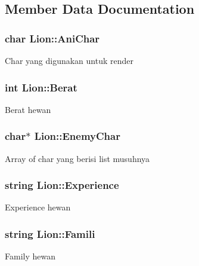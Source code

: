 \subsection{Member Data Documentation}
\subsubsection[{\texorpdfstring{Ani\+Char}{AniChar}}]{\setlength{\rightskip}{0pt plus 5cm}char Lion\+::\+Ani\+Char\hspace{0.3cm}{\ttfamily [protected]}}\hypertarget{class_lion_a9f5c3247359163932b6055386a90890e}{}\label{class_lion_a9f5c3247359163932b6055386a90890e}
Char yang digunakan untuk render 
\subsubsection[{\texorpdfstring{Berat}{Berat}}]{\setlength{\rightskip}{0pt plus 5cm}int Lion\+::\+Berat\hspace{0.3cm}{\ttfamily [protected]}}\hypertarget{class_lion_ac607d8553dce1ba2700571de651599de}{}\label{class_lion_ac607d8553dce1ba2700571de651599de}
Berat hewan 
\subsubsection[{\texorpdfstring{Enemy\+Char}{EnemyChar}}]{\setlength{\rightskip}{0pt plus 5cm}char$\ast$ Lion\+::\+Enemy\+Char\hspace{0.3cm}{\ttfamily [protected]}}\hypertarget{class_lion_adf4638bf24293cb135f8f55b4c37b1c3}{}\label{class_lion_adf4638bf24293cb135f8f55b4c37b1c3}
Array of char yang berisi list musuhnya 
\subsubsection[{\texorpdfstring{Experience}{Experience}}]{\setlength{\rightskip}{0pt plus 5cm}string Lion\+::\+Experience\hspace{0.3cm}{\ttfamily [protected]}}\hypertarget{class_lion_a8a7df912e2067827d326692dc2cb3686}{}\label{class_lion_a8a7df912e2067827d326692dc2cb3686}
Experience hewan 
\subsubsection[{\texorpdfstring{Famili}{Famili}}]{\setlength{\rightskip}{0pt plus 5cm}string Lion\+::\+Famili\hspace{0.3cm}{\ttfamily [protected]}}\hypertarget{class_lion_a9784a28bec4ddd250fdec51307edd047}{}\label{class_lion_a9784a28bec4ddd250fdec51307edd047}
Family hewan 
